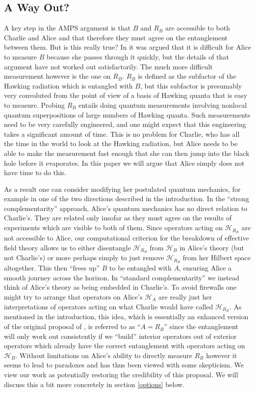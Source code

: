 \documentclass[12pt]{article}
\newcommand{\HA}{\mathcal{H}_A}
\newcommand{\HB}{\mathcal{H}_B}
\newcommand{\HRB}{\mathcal{H}_{R_B}}
\begin{document}
\subsection{A Way Out?}
A key step in the AMPS argument is that $B$ and $R_B$ are accessible to both Charlie and Alice and that therefore they must agree on the entanglement between them.  But is this really true?  In \cite{harlow} it was argued that it is difficult for Alice to measure $B$ because she passes through it quickly, but the details of that argument have not worked out satisfactorily. The much more difficult measurement however is the one on $R_B$.  $R_B$ is defined as the subfactor of the Hawking radiation which is entangled with $B$, but this subfactor is presumably very convoluted from the point of view of a basis of Hawking quanta that is easy to measure.  Probing $R_B$ entails doing quantum measurements involving nonlocal quantum superpositions of large numbers of Hawking quanta.  Such measurements need to be very carefully engineered, and one might expect that this engineering takes a significant amount of time.  This is no problem for Charlie, who has all the time in the world to look at the Hawking radiation, but Alice needs to be able to make the measurement fast enough that she can then jump into the black hole before it evaporates.  In this paper we will argue that Alice simply does not have time to do this.  

As a result one can consider modifying her postulated quantum mechanics, for example in one of the two directions described in the introduction.  In the ``strong complementarity'' approach, Alice's quantum mechanics has no direct relation to Charlie's.  They are related only insofar as they must agree on the results of experiments which are visible to both of them.  Since operators acting on $\HRB$ are not accessible to Alice, our computational criterion for the breakdown of effective field theory allows us to either disentangle $\HRB$ from $\HB$ in Alice's theory (but not Charlie's) or more perhaps simply to just remove $\HRB$ from her Hilbert space altogether.  This then ``frees up'' $B$ to be entangled with $A$, ensuring Alice a smooth journey across the horizon.  
In ``standard complementarity'' we instead think of Alice's theory as being embedded in Charlie's.  To avoid firewalls one might try to arrange that operators on Alice's $\HA$ are really just her interpretations of operators acting on what Charlie would have called $\HRB$.  As mentioned in the introduction, this idea, which is essentially an enhanced version of the original proposal of \cite{sussthorug,sussthor,susspol}, is referred to as ``$A=R_B$'' since the entanglement will only work out consistently if we ``build'' interior operators out of exterior operators which already have the correct entanglement with operators acting on $\HB$.  Without limitations on Alice's ability to directly measure $R_B$ however it seems to lead to paradoxes and has thus been viewed with some skepticism.  We view our work as potentially restoring the credibility of this proposal.  We will discuss this a bit more concretely in section \ref{options} below.
\end{document}
